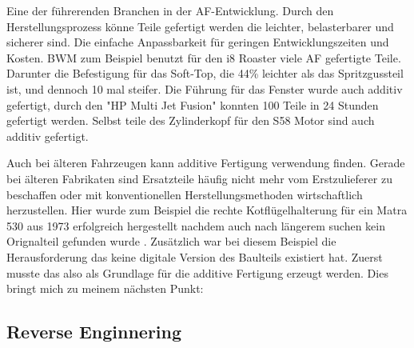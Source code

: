 \documentclass[../main.tex]{subfiles}
\begin{document}
Eine der führerenden Branchen in der AF-Entwicklung. Durch den Herstellungsprozess
könne Teile gefertigt werden die leichter, belasterbarer und sicherer sind. Die 
einfache Anpassbarkeit für geringen Entwicklungszeiten und Kosten. 
BWM zum Beispiel benutzt für den i8 Roaster viele AF gefertigte Teile.
Darunter die Befestigung für das Soft-Top, die 44\% leichter als das Spritzgussteil
ist, und dennoch 10 mal steifer. \cite{Vafadar.2021} 
Die Führung für das Fenster wurde auch additiv gefertigt, durch den "HP Multi Jet Fusion" 
konnten 100 Teile in 24 Stunden gefertigt werden. Selbst teile des Zylinderkopf für den 
S58 Motor sind auch additiv gefertigt. \cite{Anusci.2019}

Auch bei älteren Fahrzeugen kann additive Fertigung verwendung finden.
Gerade bei älteren Fabrikaten sind Ersatzteile häufig nicht mehr vom 
Erstzulieferer zu beschaffen oder mit konventionellen Herstellungsmethoden
wirtschaftlich herzustellen.
Hier wurde zum Beispiel die rechte 
Kotflügelhalterung für ein Matra 530 aus 1973 erfolgreich hergestellt nachdem auch nach längerem suchen
kein Orignalteil gefunden wurde \cite{AMExpo365.03.06.2024}. Zusätzlich war
bei diesem Beispiel die Herausforderung das keine digitale Version des
Baulteils existiert hat. Zuerst musste das also als Grundlage für die
additive Fertigung erzeugt werden. Dies bringt mich zu meinem nächsten Punkt:

\subsection{Reverse Enginnering}
\end{document}

